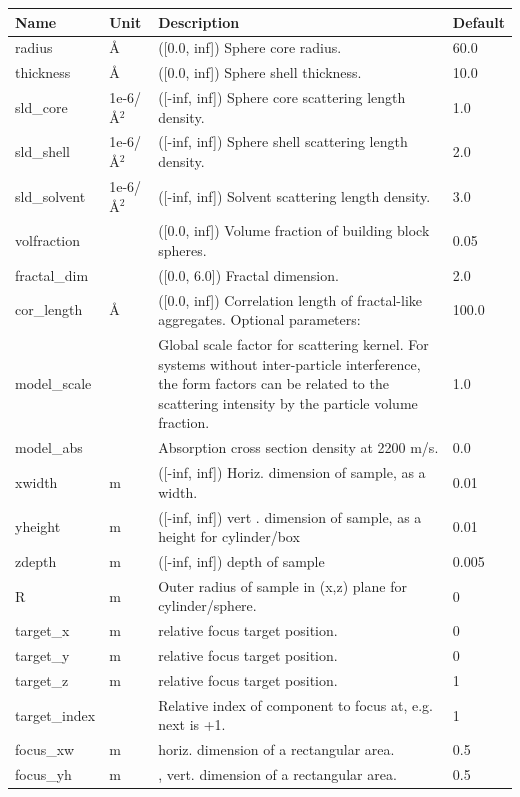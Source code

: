 \begin{longtable}{p{}p{}p{}p{}}
\toprule
\textbf{Name} & \textbf{Unit} & \textbf{Description} & \textbf{Default} \\
\midrule
\endhead
radius & \AA{} & ([0.0, inf]) Sphere core radius. & 60.0 \\
thickness & \AA{} & ([0.0, inf]) Sphere shell thickness. & 10.0 \\
sld\_core & 1e-6/\AA{}$^{2}$ & ([-inf, inf]) Sphere core scattering length density. & 1.0 \\
sld\_shell & 1e-6/\AA{}$^{2}$ & ([-inf, inf]) Sphere shell scattering length density. & 2.0 \\
sld\_solvent & 1e-6/\AA{}$^{2}$ & ([-inf, inf]) Solvent scattering length density. & 3.0 \\
volfraction &  & ([0.0, inf]) Volume fraction of building block spheres. & 0.05 \\
fractal\_dim &  & ([0.0, 6.0]) Fractal dimension. & 2.0 \\
cor\_length & \AA{} & ([0.0, inf]) Correlation length of fractal-like aggregates. Optional parameters: & 100.0 \\
model\_scale &   & Global scale factor for scattering kernel. For systems without inter-particle interference, the form factors can be related to the scattering intensity by the particle volume fraction. & 1.0 \\
model\_abs &   & Absorption cross section density at 2200 m/s. & 0.0 \\
xwidth & m & ([-inf, inf]) Horiz. dimension of sample, as a width. & 0.01 \\
yheight & m & ([-inf, inf]) vert . dimension of sample, as a height for cylinder/box & 0.01 \\
zdepth & m & ([-inf, inf]) depth of sample & 0.005 \\
R & m & Outer radius of sample in (x,z) plane for cylinder/sphere. & 0 \\
target\_x & m & relative focus target position. & 0 \\
target\_y & m & relative focus target position. & 0 \\
target\_z & m & relative focus target position. & 1 \\
target\_index &   & Relative index of component to focus at, e.g. next is +1. & 1 \\
focus\_xw & m & horiz. dimension of a rectangular area. & 0.5 \\
focus\_yh & m & , vert. dimension of a rectangular area. & 0.5 \\

\end{longtable}
